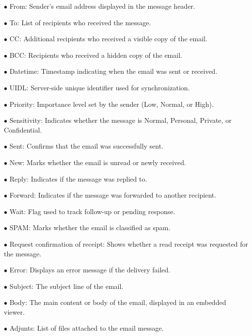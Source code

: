 \documentclass[a4paper]{article}
\begin{document}
\begin{compactitem}
\item[\color{myblue}$\bullet$] From: Sender's email address displayed in the message header.
\item[\color{myblue}$\bullet$] To: List of recipients who received the message.
\item[\color{myblue}$\bullet$] CC: Additional recipients who received a visible copy of the email.
\item[\color{myblue}$\bullet$] BCC: Recipients who received a hidden copy of the email.
\item[\color{myblue}$\bullet$] Datetime: Timestamp indicating when the email was sent or received.
\item[\color{myblue}$\bullet$] UIDL: Server-side unique identifier used for synchronization.
\item[\color{myblue}$\bullet$] Priority: Importance level set by the sender (Low, Normal, or High).
\item[\color{myblue}$\bullet$] Sensitivity: Indicates whether the message is Normal, Personal, Private, or Confidential.
\item[\color{myblue}$\bullet$] Sent: Confirms that the email was successfully sent.
\item[\color{myblue}$\bullet$] New: Marks whether the email is unread or newly received.
\item[\color{myblue}$\bullet$] Reply: Indicates if the message was replied to.
\item[\color{myblue}$\bullet$] Forward: Indicates if the message was forwarded to another recipient.
\item[\color{myblue}$\bullet$] Wait: Flag used to track follow-up or pending response.
\item[\color{myblue}$\bullet$] SPAM: Marks whether the email is classified as spam.
\item[\color{myblue}$\bullet$] Request confirmation of receipt: Shows whether a read receipt was requested for the message.
\item[\color{myblue}$\bullet$] Error: Displays an error message if the delivery failed.
\item[\color{myblue}$\bullet$] Subject: The subject line of the email.
\item[\color{myblue}$\bullet$] Body: The main content or body of the email, displayed in an embedded viewer.
\item[\color{myblue}$\bullet$] Adjunts: List of files attached to the email message.
\end{compactitem}
\end{document}
